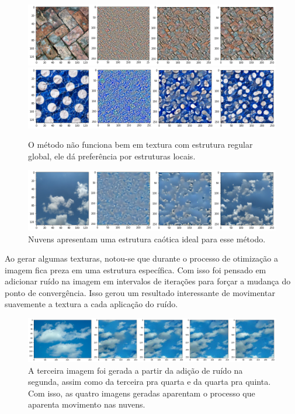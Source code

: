 \begin{figure}[!ht]
	\centering
	\includegraphics[width=\linewidth]{files/assets/results/result1.png}
	\includegraphics[width=\linewidth]{files/assets/results/result3.png}
	\caption{O método não funciona bem em textura com 
	estrutura regular global, ele dá preferência por
	estruturas locais. }
	\label{img:preview}
\end{figure}



\begin{figure}[!ht]
	\centering
	\includegraphics[width=\linewidth]{files/assets/results/result4.png}
	\caption{Nuvens apresentam uma estrutura caótica
	ideal para esse método.}
	\label{img:preview}
\end{figure}

Ao gerar algumas texturas, notou-se que durante
o processo de otimização a imagem fica preza em 
uma estrutura específica. Com isso foi pensado
em adicionar ruído na imagem em intervalos de iterações
para forçar a mudança do ponto de convergência.
Isso gerou um resultado interessante de movimentar
suavemente a textura a cada aplicação do ruído.

\begin{figure}[!ht]
	\centering
	\includegraphics[width=\linewidth]{files/assets/results/result6.png}
	\caption{A terceira imagem foi gerada a partir da adição de ruído
		na segunda, assim como da terceira pra quarta e da quarta pra
		quinta. 
		Com isso, as quatro imagens geradas aparentam o processo
	que aparenta movimento nas nuvens.}
	\label{img:preview}
\end{figure}

